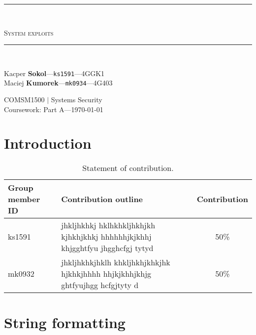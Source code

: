 \documentclass[12pt, a4paper, pdflatex]{article}
\newcommand{\HRule}{\rule{\linewidth}{0.5mm}}
\begin{document}

\begin{center}
    \begin{large}
    {\HRule \\[0.2cm]}
    \textsc{System exploits}
    {\HRule \\[0.3cm]}
    \end{large}

    \begin{minipage}{ 0.49\textwidth }
        \begin{flushleft}
            Kacper \textbf{Sokol}---\texttt{ks1591}---4GGK1\\
            Maciej \textbf{Kumorek}---\texttt{mk0934}---4G403\\
        \end{flushleft}
    \end{minipage}
    \begin{minipage}{ 0.49\textwidth }
        \begin{flushright}
            {COMSM1500 $|$ Systems Security\\
            Coursework: Part A---\today\\[0.3cm]}
        \end{flushright}
    \end{minipage}
\end{center}

\section{Introduction}

\begin{center}
  \begin{table}[h]
    \begin{tabular}{ l | p{8.5cm} | c }
      Group member ID & Contribution outline & Contribution \\
      \hline
      ks1591 & jhkljhkhkj hklhkhkljhkhjkh kjhkhjkhkj hhhhhhjkjkhhj khjgghtfyu jhgghcfgj tytyd & 50\% \\
      mk0932 & jhkljhkhkjhklh  khkljhkhjkhkjhk hjkhkjhhhh hhjkjkhhjkhjg ghtfyujhgg hcfgjtyty d & 50\% \\
    \end{tabular}
    \caption{Statement of contribution.\label{tab:SoC}}
  \end{table}
\end{center}

\section{String formatting}
\end{document}
